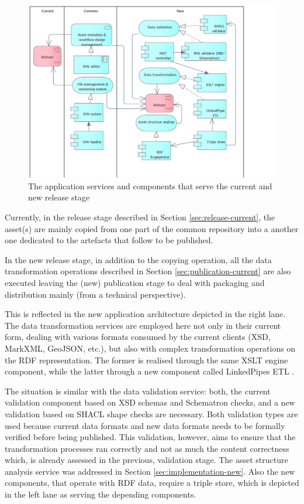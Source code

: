 	\begin{figure}[h]
		\centering
		\includegraphics[width=.9\textwidth]{images/application/Release v3.png}
		\caption{The application services and components that serve the current and new release stage}
		\label{fig:application-release}
	\end{figure}

	Currently, in the release stage described in Section \ref{sec:release-current}, the asset(s) are mainly copied from one part of the common repository into a another one dedicated to the artefacts that follow to be published. 
	
	In the new release stage, in addition to the copying operation, all the data transformation operations described in Section \ref{sec:publication-current} are also executed leaving the (new) publication stage to deal with packaging and distribution mainly (from a technical perspective).
	
	This is reflected in the new application architecture depicted in the right lane. The data transformation services are employed here not only in their current form, dealing with various formats consumed by the current clients (XSD, MarkXML, GeoJSON, etc.), but also with complex transformation operations on the RDF representation. The former is realised through the same XSLT engine component, while the latter through a new component called LinkedPipes ETL \citep{linkedpipes-klimek2016linkedpipes,linkedpipes-klimek2017linkedpipes}.
	
	The situation is similar with the data validation service: both, the current validation component based on XSD schemas and Schematron checks, and a new validation based on SHACL shape checks are necessary. Both validation types are used because current data formats and new data formats needs to be formally verified before being published. This validation, however, aims to ensure that the transformation processes ran correctly and not as much the content correctness which, is already assessed in the previous, validation stage. The asset structure analysis service was addressed in Section \ref{sec:implementation-new}. Also the new components, that operate with RDF data, require a triple store, which is depicted in the left lane as serving the depending components.
	
